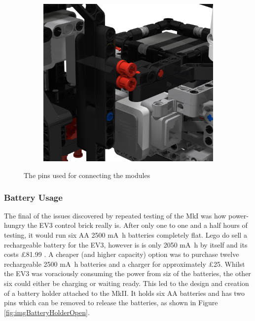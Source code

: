\documentclass{report}
\begin{document}
\begin{figure}[H]
\begin{subfigure}[b]{0.25\textwidth}
			\label{fig:rdrModulePins2}
		\end{subfigure}
		\hspace{10mm}
		\begin{subfigure}[b]{0.25\textwidth}
			\includegraphics[width=\textwidth]{Resources/Images/rdrModulePins3.png}
			\label{fig:rdrModulePins3}
		\end{subfigure}
		\caption{The pins used for connecting the modules}
		\label{fig:rdrModulePins}
	\end{figure}
	
	\subsubsection{Battery Usage}
	
	The final of the issues discovered by repeated testing of the MkI was how power-hungry the EV3 control brick really is. After only one to one and a half hours of testing, it would run six AA 2500 \si{\milli\ampere\hour} batteries completely flat. Lego do sell a rechargeable battery for the EV3, however is is only 2050 \si{\milli\ampere\hour} by itself and its costs £81.99 \cite{Lego2018}. A cheaper (and higher capacity) option was to purchase twelve rechargeable 2500 \si{\milli\ampere\hour} batteries and a charger for approximately £25. Whilst the EV3 was voraciously consuming the power from siz of the batteries, the other six could either be charging or waiting ready. This led to the design and creation of a battery holder attached to the MkII. It holds six AA batteries and has two pins which can be removed to release the batteries, as shown in Figure \ref{fig:imgBatteryHolderOpen}.
	
\end{document}
